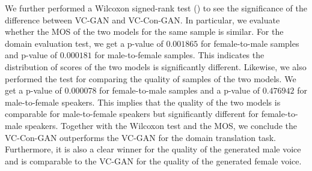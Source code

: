 We further performed a Wilcoxon signed-rank test (\cite{wilcoxon1970critical}) to see the significance of the difference between VC-GAN and VC-Con-GAN. In particular, we evaluate whether the MOS of the two models for the same sample is similar. For the domain evaluation test, we get a p-value of $0.001865$ for female-to-male samples and p-value of $0.000181$ for male-to-female samples. This indicates the distribution of scores of the two models is significantly different. Likewise, we also performed the test for comparing the quality of samples of the two models. We get a p-value of $0.000078$ for female-to-male samples and a p-value of $0.476942$ for male-to-female speakers. This implies that the quality of the two models is comparable for male-to-female speakers but significantly different for female-to-male speakers. Together with the Wilcoxon test and the MOS, we conclude the VC-Con-GAN outperforms the VC-GAN for the domain translation task. Furthermore, it is also a clear winner for the quality of the generated male voice and is comparable to the VC-GAN for the quality of the generated female voice.


